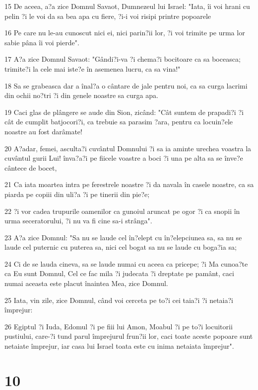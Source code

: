 \par 15 De aceea, a?a zice Domnul Savaot, Dumnezeul lui Israel: "Iata, îi voi hrani cu pelin ?i le voi da sa bea apa cu fiere, ?i-i voi risipi printre popoarele
\par 16 Pe care nu le-au cunoscut nici ei, nici parin?ii lor, ?i voi trimite pe urma lor sabie pâna îi voi pierde".
\par 17 A?a zice Domnul Savaot: "Gândi?i-va ?i chema?i bocitoare ca sa boceasca; trimite?i la cele mai iste?e în asemenea lucru, ca sa vina!"
\par 18 Sa se grabeasca dar a înal?a o cântare de jale pentru noi, ca sa curga lacrimi din ochii no?tri ?i din genele noastre sa curga apa.
\par 19 Caci glas de plângere se aude din Sion, zicând: "Cât suntem de prapadi?i ?i cât de cumplit batjocori?i, ca trebuie sa parasim ?ara, pentru ca locuin?ele noastre au fost darâmate!
\par 20 A?adar, femei, asculta?i cuvântul Domnului ?i sa ia aminte urechea voastra la cuvântul gurii Lui! înva?a?i pe fiicele voastre a boci ?i una pe alta sa se înve?e cântece de bocet,
\par 21 Ca iata moartea intra pe ferestrele noastre ?i da navala în casele noastre, ca sa piarda pe copiii din uli?a ?i pe tinerii din pie?e;
\par 22 ?i vor cadea trupurile oamenilor ca gunoiul aruncat pe ogor ?i ca snopii în urma seceratorului, ?i nu va fi cine sa-i strânga".
\par 23 A?a zice Domnul: "Sa nu se laude cel în?elept cu în?elepciunea sa, sa nu se laude cel puternic cu puterea sa, nici cel bogat sa nu se laude cu boga?ia sa;
\par 24 Ci de se lauda cineva, sa se laude numai cu aceea ca pricepe; ?i Ma cunoa?te ca Eu sunt Domnul, Cel ce fac mila ?i judecata ?i dreptate pe pamânt, caci numai aceasta este placut înaintea Mea, zice Domnul.
\par 25 Iata, vin zile, zice Domnul, când voi cerceta pe to?i cei taia?i ?i netaia?i împrejur:
\par 26 Egiptul ?i Iuda, Edomul ?i pe fiii lui Amon, Moabul ?i pe to?i locuitorii pustiului, care-?i tund parul împrejurul frun?ii lor, caci toate aceste popoare sunt netaiate împrejur, iar casa lui Israel toata este cu inima netaiata împrejur".

\chapter{10}

